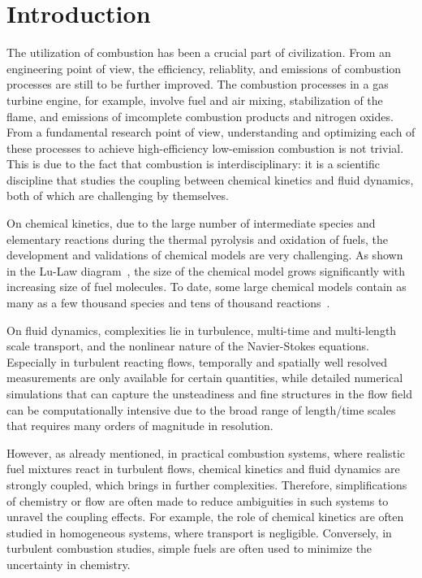 \chapter{Introduction\label{ch:intro}}

The utilization of combustion has been a crucial part of civilization.  From an engineering point of view, the efficiency, reliablity, and emissions of combustion processes are still to be further improved.  The combustion processes in a gas turbine engine, for example, involve fuel and air mixing, stabilization of the flame, and emissions of imcomplete combustion products and nitrogen oxides.  From a fundamental research point of view, understanding and optimizing each of these processes to achieve high-efficiency low-emission combustion is not trivial.  This is due to the fact that combustion is interdisciplinary: it is a scientific discipline that studies the coupling between chemical kinetics and fluid dynamics, both of which are challenging by themselves.  

On chemical kinetics, due to the large number of intermediate species and elementary reactions during the thermal pyrolysis and oxidation of fuels, the development and validations of chemical models are very challenging.  As shown in the Lu-Law diagram~\cite{lu09}, the size of the chemical model grows significantly with increasing size of fuel molecules.  To date, some large chemical models contain as many as a few thousand species and tens of thousand reactions~\cite{lu09}.  

On fluid dynamics, complexities lie in turbulence, multi-time and multi-length scale transport, and the nonlinear nature of the Navier-Stokes equations.  Especially in turbulent reacting flows, temporally and spatially well resolved measurements are only available for certain quantities, while detailed numerical simulations that can capture the unsteadiness and fine structures in the flow field can be computationally intensive due to the broad range of length/time scales that requires many orders of magnitude in resolution.

However, as already mentioned, in practical combustion systems, where realistic fuel mixtures react in turbulent flows, chemical kinetics and fluid dynamics are strongly coupled, which brings in further complexities.  Therefore, simplifications of chemistry or flow are often made to reduce ambiguities in such systems to unravel the coupling effects.  For example, the role of chemical kinetics are often studied in homogeneous systems, where transport is negligible.  Conversely, in turbulent combustion studies, simple fuels are often used to minimize the uncertainty in chemistry.  

